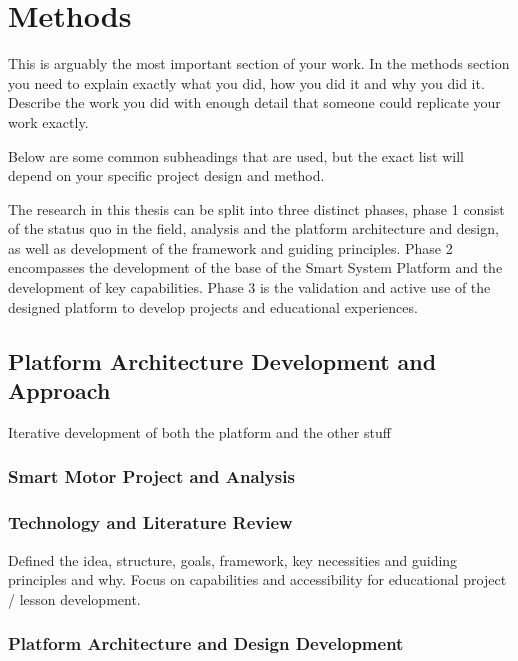 \cleardoublepage%
\chapter{\label{chap:methods}Methods}%

This is arguably the most important section of your work.  In the methods section you need to explain exactly what you did, how you did it and why you did it. Describe the work you did with enough detail that someone could replicate your work exactly.

Below are some common subheadings that are used, but the exact list will depend on your specific project design and method.

The research in this thesis can be split into three distinct phases, phase 1 consist of the status quo in the field, analysis and the platform architecture and design, as well as development of the framework and guiding principles. Phase 2 encompasses the development of the base of the Smart System Platform and the development of key capabilities. Phase 3 is the validation and active use of the designed platform to develop projects and educational experiences.

\section{\label{sec:methods_platform_dev}Platform Architecture Development and Approach}

Iterative development of both the platform and the other stuff

\subsection{\label{sec:methods_sm_analysis}Smart Motor Project and Analysis}

\subsection{\label{sec:methods_tech_review}Technology and Literature Review}

Defined the idea, structure, goals, framework, key necessities and guiding principles and why. 
Focus on capabilities and accessibility for educational project / lesson development. 

\subsection{\label{sec:methods_exp1}Platform Architecture and Design Development}

